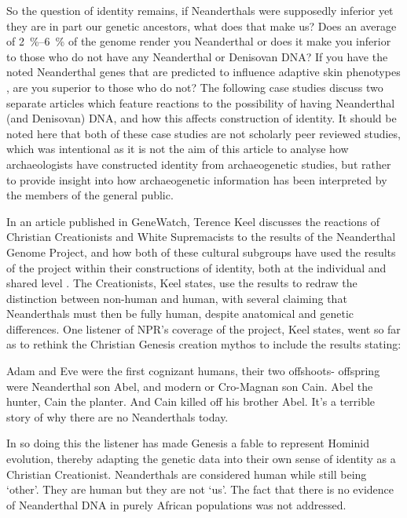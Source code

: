 So the question of identity remains, if Neanderthals were supposedly inferior yet they are in part our genetic ancestors, what does that make us? Does an average of \SIrange[range-phrase=--]{2}{6}{\percent} of the genome render you Neanderthal or does it make you inferior to those who do not have any Neanderthal or Denisovan DNA? If you have the noted Neanderthal genes that are predicted to influence adaptive skin phenotypes \parencite{Vernot_2014}, are you superior to those who do not? The following case studies discuss two separate articles which feature reactions to the possibility of having Neanderthal (and Denisovan) DNA, and how this affects construction of identity. It should be noted here that both of these case studies are not scholarly peer reviewed studies, which was intentional as it is not the aim of this article to analyse how archaeologists have constructed identity from archaeogenetic studies, but rather to provide insight into how archaeogenetic information has been interpreted by the members of the general public.


In an article published in GeneWatch, Terence Keel discusses the reactions of Christian Creationists and White Supremacists to the results of the Neanderthal Genome Project, and how both of these cultural subgroups have used the results of the project within their constructions of identity, both at the individual and shared level \parencite{Keel_2010}. The Creationists, Keel states, use the results to redraw the distinction between non-human and human, with several claiming that Neanderthals must then be fully human, despite anatomical and genetic differences. One listener of NPR’s coverage of the project, Keel states, went so far as to rethink the Christian Genesis creation mythos to include the results stating:

\begin{aquote}{\cite{Keel_2010}}
Adam and Eve were the first cognizant humans, their two offshoots- offspring were Neanderthal son Abel, and modern or Cro-Magnan son Cain. Abel the hunter, Cain the planter. And Cain killed off his brother Abel. It’s a terrible story of why there are no Neanderthals today.
\end{aquote}
In so doing this the listener has made Genesis a fable to represent Hominid evolution, thereby adapting the genetic data into their own sense of identity as a Christian Creationist. Neanderthals are considered human while still being ‘other’. They are human but they are not ‘us’. The fact that there is no evidence of Neanderthal DNA in purely African populations was not addressed.

